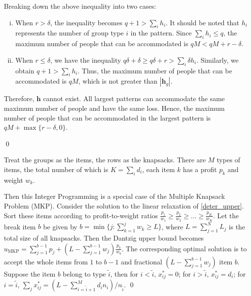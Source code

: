 \begin{pf}
Breaking down the above inequality into two cases:

\begin{enumerate}[(i)]
  \item When $r > \delta$, the inequality becomes $q+1 > \sum_{i} h_i$. It should be noted that $h_i$ represents the number of group type $i$ in the pattern. Since $\sum_{i} h_i \leq q$, the maximum number of people that can be accommodated is $q M < q M + r-\delta$.  
  \item When $r \leq \delta$, we have the inequality $q \delta + \delta \geq q \delta + r > \sum_{i} \delta h_i$. Similarly, we obtain $q+1 > \sum_{i} h_i$. Thus, the maximum number of people that can be accommodated is $q M$, which is not greater than $|\bm{h}_{g}|$.  
\end{enumerate}

Therefore, $\bm{h}$ cannot exist. All largest patterns can accommodate the same maximum number of people and have the same loss. Hence, the maximum number of people that can be accommodated in the largest pattern is $q M + \max\{r-\delta, 0\}$. 

\qed
\end{pf}

\begin{pf}
  Treat the groups as the items, the rows as the knapsacks. There are $M$ types of items, the total number of which is $K = \sum_{i} d_i$, each item $k$ has a profit $p_k$ and weight $w_k$. 
  
  Then this Integer Programming is a special case of the Multiple Knapsack Problem (MKP). Consider the solution to the linear relaxation of \eqref{deter_upper}. Sort these items according to profit-to-weight ratios $\frac{p_1}{w_1} \geq \frac{p_2}{w_2} \geq \ldots \geq \frac{p_K}{w_K}$. 
  Let the break item $b$ be given by $b=\min \{j: \sum_{k=1}^j w_k \geq L\}$, where $L = \sum_{j=1}^{N} L_j$ is the total size of all knapsacks. Then the Dantzig upper bound \cite{dantzig1957discrete} becomes $u_{\mathrm{MKP}}=\sum_{j=1}^{b-1} p_j+\left(L-\sum_{j=1}^{b-1} w_j\right) \frac{p_b}{w_b}$. The corresponding optimal solution is to accept the whole items from $1$ to $b-1$ and fractional $(L-\sum_{j=1}^{b-1} w_j)$ item $b$. Suppose the item $b$ belong to type $\tilde{i}$, then for $i < \tilde{i}$, $x_{ij}^{*} = 0$; for $i > \tilde{i}$, $x_{ij}^{*} = d_{i}$; for $i = \tilde{i}$, $\sum_{j} x_{ij}^{*} = (L - \sum_{i = \tilde{i}+1}^{M} {d_i n_i})/ n_{\tilde{i}}$. \qed
\end{pf}


